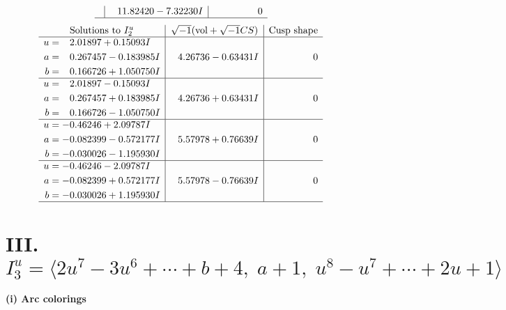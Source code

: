 \documentclass[1p]{elsarticle_modified}
\theoremstyle{definition}
\newcommand{\I}{\sqrt{-1}}
\begin{document}
$$\begin{array}{c|c|c}
 & \phantom{-}11.82420 - 7.32230 I & \phantom{-0.000000 } 0\\
 \hline 
 \end{array}$$\newpage$$\begin{array}{c|c|c}  
\text{Solutions to }I^u_{2}& \I (\text{vol} + \sqrt{-1}CS) & \text{Cusp shape}\\
 \hline 
\begin{aligned}
u &= \phantom{-}2.01897 + 0.15093 I \\
a &= \phantom{-}0.267457 - 0.183985 I \\
b &= \phantom{-}0.166726 + 1.050750 I\end{aligned}
 & \phantom{-}4.26736 - 0.63431 I & \phantom{-0.000000 } 0 \\ \hline\begin{aligned}
u &= \phantom{-}2.01897 - 0.15093 I \\
a &= \phantom{-}0.267457 + 0.183985 I \\
b &= \phantom{-}0.166726 - 1.050750 I\end{aligned}
 & \phantom{-}4.26736 + 0.63431 I & \phantom{-0.000000 } 0 \\ \hline\begin{aligned}
u &= -0.46246 + 2.09787 I \\
a &= -0.082399 - 0.572177 I \\
b &= -0.030026 - 1.195930 I\end{aligned}
 & \phantom{-}5.57978 + 0.76639 I & \phantom{-0.000000 } 0 \\ \hline\begin{aligned}
u &= -0.46246 - 2.09787 I \\
a &= -0.082399 + 0.572177 I \\
b &= -0.030026 + 1.195930 I\end{aligned}
 & \phantom{-}5.57978 - 0.76639 I & \phantom{-0.000000 } 0\\
 \hline 
 \end{array}$$\newpage\newpage\renewcommand{\arraystretch}{1}
\centering \section*{III. $I^u_{3}= \langle 2 u^7-3 u^6+\cdots+b+4,\;a+1,\;u^8- u^7+\cdots+2 u+1 \rangle$}
\flushleft \textbf{(i) Arc colorings}\\
\end{document}
